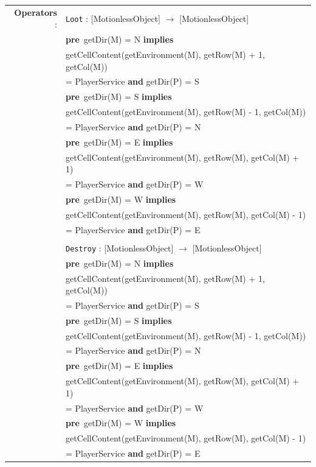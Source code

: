 \documentclass[12pt]{report}
\begin{document}
\begin{tabular}{rl}
\textbf{Operators} : & \texttt{Loot} : \textrm{[MotionlessObject]} $\rightarrow$ \textrm{[MotionlessObject]} \\
& \quad\quad \textbf{pre}~getDir(M) = N \textbf{implies} \\
& getCellContent(getEnvironment(M), getRow(M) + 1, getCol(M)) \\
& = PlayerService \textbf{and} getDir(P) = S \\
& \quad\quad \textbf{pre}~getDir(M) = S \textbf{implies} \\
& getCellContent(getEnvironment(M), getRow(M) - 1, getCol(M)) \\
& = PlayerService \textbf{and} getDir(P) = N \\
& \quad\quad \textbf{pre}~getDir(M) = E \textbf{implies} \\
& getCellContent(getEnvironment(M), getRow(M), getCol(M) + 1) \\
& = PlayerService \textbf{and} getDir(P) = W \\
& \quad\quad \textbf{pre}~getDir(M) = W \textbf{implies} \\
& getCellContent(getEnvironment(M), getRow(M), getCol(M) - 1) \\
& = PlayerService \textbf{and} getDir(P) = E \\
\\
& \texttt{Destroy} : \textrm{[MotionlessObject]} $\rightarrow$ \textrm{[MotionlessObject]} \\
& \quad\quad \textbf{pre}~getDir(M) = N \textbf{implies} \\
& getCellContent(getEnvironment(M), getRow(M) + 1, getCol(M)) \\
& = PlayerService \textbf{and} getDir(P) = S \\
& \quad\quad \textbf{pre}~getDir(M) = S \textbf{implies} \\
& getCellContent(getEnvironment(M), getRow(M) - 1, getCol(M)) \\
& = PlayerService \textbf{and} getDir(P) = N \\
& \quad\quad \textbf{pre}~getDir(M) = E \textbf{implies} \\
& getCellContent(getEnvironment(M), getRow(M), getCol(M) + 1) \\
& = PlayerService \textbf{and} getDir(P) = W \\
& \quad\quad \textbf{pre}~getDir(M) = W \textbf{implies} \\
& getCellContent(getEnvironment(M), getRow(M), getCol(M) - 1) \\
& = PlayerService \textbf{and} getDir(P) = E

\end{tabular}
\end{document}
